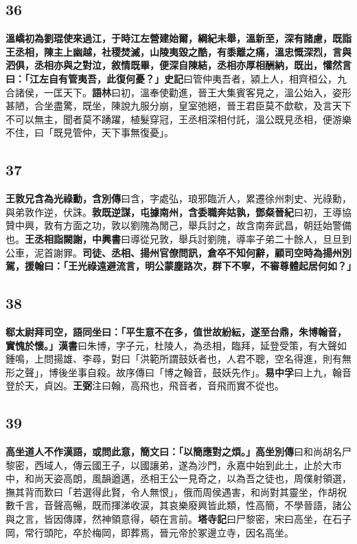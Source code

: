 \subsection*{36}

\textbf{溫嶠初為劉琨使來過江，于時江左營建始爾，綱紀未舉，溫新至，深有諸慮，既詣王丞相，陳主上幽越，社稷焚滅，山陵夷毀之酷，有黍離之痛，溫忠慨深烈，言與泗俱，丞相亦與之對泣，敘情既畢，便深自陳結，丞相亦厚相酬納，既出，懽然言曰：「江左自有管夷吾，此復何憂？」}{\footnotesize \textbf{史記}曰管仲夷吾者，潁上人，相齊桓公，九合諸侯，一匡天下。\textbf{語林}曰初，溫奉使勸進，晉王大集賓客見之，溫公始入，姿形甚陋，合坐盡驚，既坐，陳說九服分崩，皇室弛絕，晉王君臣莫不歔欷，及言天下不可以無主，聞者莫不踴躍，植髮穿冠，王丞相深相付託，溫公既見丞相，便游樂不住，曰「既見管仲，天下事無復憂」。}

\subsection*{37}

\textbf{王敦兄含為光祿勳，}{\footnotesize \textbf{含別傳}曰含，字處弘，琅邪臨沂人，累遷徐州刺史、光祿勳，與弟敦作逆，伏誅。}\textbf{敦既逆謀，屯據南州，含委職奔姑孰，}{\footnotesize \textbf{鄧粲晉紀}曰初，王導協贊中興，敦有方面之功，敦以劉隗為閒己，舉兵討之，故含南奔武昌，朝廷始警備也。}\textbf{王丞相詣闕謝，}{\footnotesize \textbf{中興書}曰導從兄敦，舉兵討劉隗，導率子弟二十餘人，旦旦到公車，泥首謝罪。}\textbf{司徒、丞相、揚州官僚問訊，倉卒不知何辭，顧司空時為揚州別駕，援翰曰：「王光祿遠避流言，明公蒙塵路次，群下不寧，不審尊體起居何如？」}

\subsection*{38}

\textbf{郗太尉拜司空，語同坐曰：「平生意不在多，值世故紛紜，遂至台鼎，朱博翰音，實愧於懷。」}{\footnotesize \textbf{漢書}曰朱博，字子元，杜陵人，為丞相，臨拜，延登受策，有大聲如鍾鳴，上問揚雄、李尋，對曰「洪範所謂鼓妖者也，人君不聰，空名得進，則有無形之聲」，博後坐事自殺。故序傳曰「博之翰音，鼓妖先作」。\textbf{易中孚}曰上九，翰音登於天，貞凶。\textbf{王弼}注曰翰，高飛也，飛音者，音飛而實不從也。}

\subsection*{39}

\textbf{高坐道人不作漢語，或問此意，簡文曰：「以簡應對之煩。」}{\footnotesize \textbf{高坐別傳}曰和尚胡名尸黎密，西域人，傳云國王子，以國讓弟，遂為沙門，永嘉中始到此土，止於大市中，和尚天姿高朗，風韻遒邁，丞相王公一見奇之，以為吾之徒也，周僕射領選，撫其背而歎曰「若選得此賢，令人無恨」，俄而周侯遇害，和尚對其靈坐，作胡祝數千言，音聲高暢，既而揮涕收涙，其哀樂廢興皆此類，性高簡，不學晉語，諸公與之言，皆因傳譯，然神領意得，頓在言前。\textbf{塔寺記}曰尸黎密，宋曰高坐，在石子岡，常行頭陀，卒於梅岡，即葬焉，晉元帝於冢邊立寺，因名高坐。}

